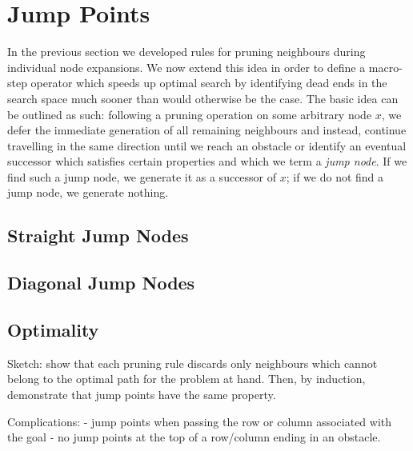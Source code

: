 \section{Jump Points}
In the previous section we developed rules for pruning neighbours during 
individual node expansions. We now extend this idea in order to define a 
macro-step operator which speeds up optimal search by identifying dead ends in the 
search space much sooner than would otherwise be the case.
The basic idea can be outlined as such:  following a pruning operation on some
arbitrary node $x$, we defer the immediate generation of all remaining neighbours 
and instead, continue travelling in the same direction until we reach an obstacle 
or identify an eventual successor which satisfies certain properties and which 
we term a \emph{jump node}.
If we find such a jump node, we generate it as a successor of $x$; if we do not 
find a jump node, we generate nothing.

\subsection{Straight Jump Nodes}


\subsection{Diagonal Jump Nodes}



\subsection{Optimality}
Sketch: show that each pruning rule discards only neighbours
which cannot belong to the optimal path for the problem at hand.
Then, by induction, demonstrate that jump points have the same 
property. 

Complications:
 - jump points when passing the row or column associated with the goal
 - no jump points at the top of a row/column ending in an obstacle.

